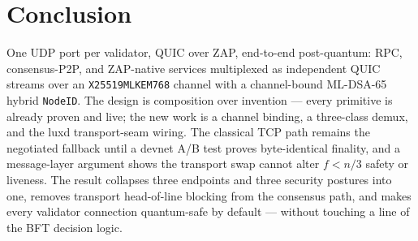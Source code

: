 \documentclass[11pt,a4paper]{article}
\newcommand{\code}[1]{\texttt{#1}}
\begin{document}
\section{Conclusion}\label{sec:conclusion}

One UDP port per validator, QUIC over ZAP, end-to-end post-quantum: RPC,
consensus-P2P, and ZAP-native services multiplexed as independent QUIC
streams over an \code{X25519MLKEM768} channel with a channel-bound
ML-DSA-65 hybrid \code{NodeID}. The design is composition over invention
--- every primitive is already proven and live; the new work is a channel
binding, a three-class demux, and the luxd transport-seam wiring. The
classical TCP path remains the negotiated fallback until a
devnet A/B test proves byte-identical finality, and a message-layer
argument shows the transport swap cannot alter $f<n/3$ safety or
liveness. The result collapses three endpoints and three security
postures into one, removes transport head-of-line blocking from the
consensus path, and makes every validator connection quantum-safe by
default --- without touching a line of the BFT decision logic.



\end{document}
